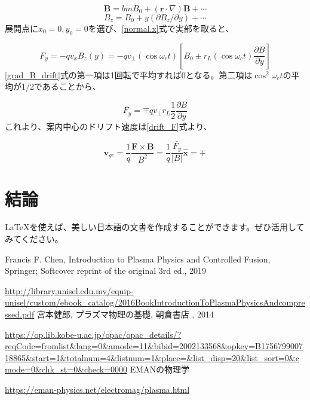 \documentclass{ltjsarticle}
\numberwithin{equation}{section} %
\begin{document}
\begin{equation}
  \bm{B} = bm{B}_0 + (\bm{r}\cdot \nabla)\bm{B} + \cdots
\end{equation}
\[
  B_z = B_0 + y(\partial B_z/\partial y) + \cdots
\]
展開点に$x_0=0, y_0=0$を選び、\eqref{normal.x}式で実部を取ると、

\begin{equation}
  F_y = -qv_x B_z(y) = -qv_\perp (\cos{\omega_ct})\left[B_0 \pm r_L(\cos{\omega_c t})\frac{\partial B}{\partial y}\right] \label{grad_B_drift}
\end{equation}
\eqref{grad_B_drift}式の第一項は1回転で平均すれば0となる。第二項は$\cos^2{\omega_c t}$の平均が1/2であることから、

\begin{equation}
  \bar{F_y} = \mp q v_\perp r_L \frac{1}{2}\frac{\partial B}{\partial y}
\end{equation}
これより、案内中心のドリフト速度は\eqref{drift_F}式より、

\begin{equation}
  \bm{v}_{gc} = \frac{1}{q}\frac{\bm{F} \times \bm{B}}{B^2} = \frac{1}{q} \frac{\bar{F_y}}{|B|}\hat{\bm{x}} = \mp \frac{}{}
\end{equation}





\section{結論}
LaTeXを使えば、美しい日本語の文書を作成することができます。ぜひ活用してみてください。




\begin{thebibliography}{99}
 Francis F. Chen, Introduction to Plasma Physics and Controlled Fusion, Springer; Softcover reprint of the original 3rd ed., 2019\par
\url{http://library.unisel.edu.my/equip-unisel/custom/ebook_catalog/2016BookIntroductionToPlasmaPhysicsAndcompressed.pdf}
 宮本健郎, プラズマ物理の基礎, 朝倉書店 , 2014\par
\url{https://op.lib.kobe-u.ac.jp/opac/opac_details/?reqCode=fromlist&lang=0&amode=11&bibid=2002133568&opkey=B175679900718865&start=1&totalnum=4&listnum=1&place=&list_disp=20&list_sort=0&cmode=0&chk_st=0&check=0000}
 EMANの物理学\par
\url{https://eman-physics.net/electromag/plasma.html}
\end{thebibliography}
\end{document}
